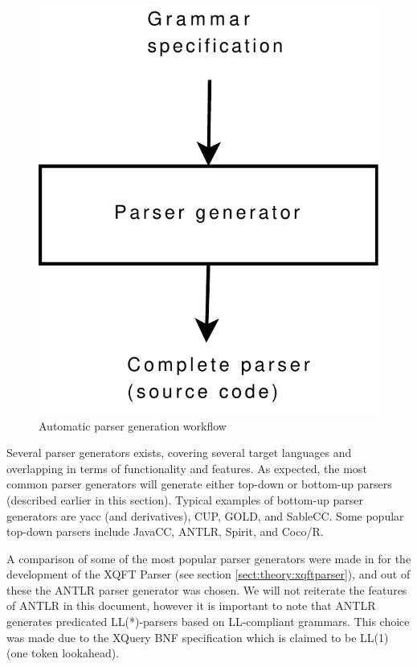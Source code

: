 \begin{figure}[h]
  \centering
    \includegraphics[scale=0.40]{diagrams/parser_generator}
  \caption{Automatic parser generation workflow}
  \label{figure:parser:generator}
\end{figure}

Several parser generators exists, covering several target languages and
overlapping in terms of functionality and features. As expected, the most
common parser generators will generate either top-down or bottom-up parsers
(described earlier in this section). Typical examples of bottom-up parser
generators are yacc (and derivatives), CUP, GOLD, and SableCC. Some popular
top-down parsers include JavaCC, ANTLR, Spirit, and Coco/R.

A comparison of some of the most popular parser generators were
made in \cite{ourselves} for the development of the XQFT Parser (see section 
\ref{sect:theory:xqftparser}), and out of these the ANTLR parser generator was
chosen. We will not reiterate the features of ANTLR in this document, however
it is important to note that ANTLR generates predicated LL(*)-parsers based on
LL-compliant grammars. This choice was made due to the XQuery BNF specification
which is claimed to be LL(1) (one token lookahead).

